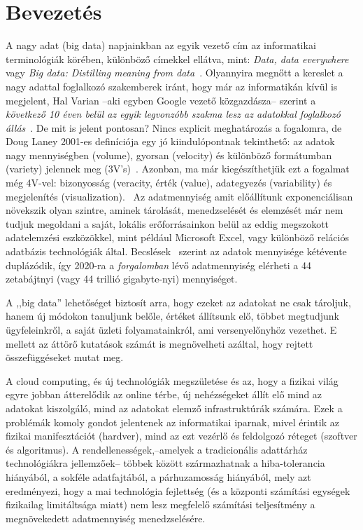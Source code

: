 \documentclass[a4paper,12pt]{article}
\author{Belényesi Roland}
\begin{document}
\tableofcontents
\newpage

\section{Bevezetés}
A nagy adat (big data) napjainkban az egyik vezető cím az informatikai terminológiák körében, különböző címekkel ellátva, mint: 
\textsl{Data, data everywhere}~\cite{economist} vagy 
\textsl{Big data: Distilling meaning from data}~\cite{nature}. Olyannyira megnőtt a kereslet a nagy adattal foglalkozó szakemberek iránt, hogy már az informatikán kívül is megjelent, Hal Varian --aki egyben Google vezető közgazdásza-- szerint a \textsl{következő 10 éven belül az egyik legvonzóbb szakma lesz az adatokkal foglalkozó állás}~\parencite{varian}. De mit is jelent pontosan? Nincs explicit meghatározás a fogalomra, de Doug Laney 2001-es definíciója egy jó kiindulópontnak tekinthető: az adatok nagy mennyiségben (volume), gyorsan (velocity) és különböző formátumban (variety) jelennek meg (3V's)~\cite{3v}. Azonban, ma már kiegészíthetjük ezt a fogalmat még 4V-vel: bizonyosság (veracity, érték (value), adategyezés (variability) és megjelenítés (visualization).~\cite{7v} Az adatmennyiség amit előállítunk exponenciálisan növekszik olyan szintre, aminek tárolását, menedzselését és elemzését már nem tudjuk megoldani a saját, lokális erőforrásainkon belül az eddig megszokott adatelemzési eszközökkel, mint például Microsoft Excel, vagy különböző relációs adatbázis technológiák által.
Becslések~\cite{2020} szerint az adatok mennyisége kétévente duplázódik, így 2020-ra a \textsl{forgalomban} lévő adatmennyiség elérheti a 44 zetabájtnyi (vagy 44 trillió gigabyte-nyi) mennyiséget.
\newline

A ,,big data'' lehetőséget biztosít arra, hogy ezeket az adatokat ne csak tároljuk, hanem új módokon tanuljunk belőle, értéket állítsunk elő, többet megtudjunk ügyfeleinkről, a saját üzleti folyamatainkról, ami versenyelőnyhöz vezethet. E mellett az áttörő kutatások számát is megnövelheti azáltal, hogy rejtett összefüggéseket mutat meg.~\cite{brk} 

A cloud computing, és új technológiák megszületése és az, hogy a fizikai világ egyre jobban átterelődik az online térbe, új nehézségeket állít elő mind az adatokat kiszolgáló, mind az adatokat elemző infrastruktúrák számára. Ezek a problémák komoly gondot jelentenek az informatikai iparnak, mivel érintik az fizikai manifesztációt (hardver), mind az ezt vezérlő és feldolgozó réteget (szoftver és algoritmus). A rendellenességek,--amelyek a tradicionális adattárház technológiákra jellemzőek-- többek között származhatnak a hiba-tolerancia hiányából, a sokféle adatfajtából, a párhuzamosság hiányából, mely azt eredményezi, hogy a mai technológia fejlettség (és a központi számítási egységek fizikailag limitáltsága miatt) nem lesz megfelelő számítási teljesítmény a megnövekedett adatmennyiség menedzselésére.
\newpage
\end{document}
